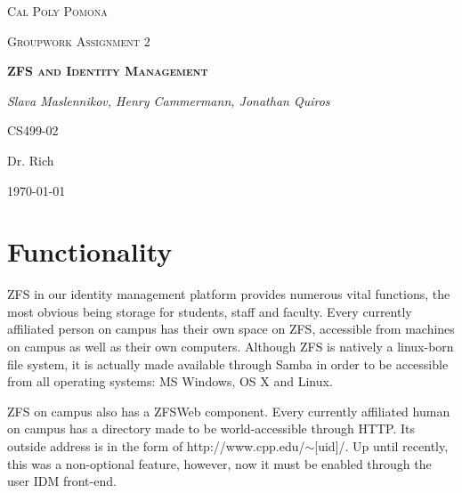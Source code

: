 \documentclass[letterpaper,12pt,titlepage]{article}
\date{Monday, March 7th 2016}
\author{Slava Maslennikov \and Henry Cammermann \and Jonathan Quiros}
\begin{document}

\begin{titlepage}
\centering
{\scshape\LARGE Cal Poly Pomona\par}
\vspace{1cm}
{\scshape\Large Groupwork Assignment 2\par}
\vspace{1.5cm}
{\scshape\bfseries ZFS and Identity Management\par}
\vspace{2cm}
{\Large\itshape Slava Maslennikov, Henry Cammermann, Jonathan Quiros\par}
\vfill
CS499-02\par
Dr. Rich
\vfill
{\large \today\par}
\end{titlepage}

\tableofcontents

%

\section{Functionality}
ZFS in our identity management platform provides numerous vital functions, the most obvious being storage for students, staff and faculty. Every currently affiliated person on campus has their own space on ZFS, accessible from machines on campus as well as their own computers. Although ZFS is natively a linux-born file system, it is actually made available through Samba in order to be accessible from all operating systems: MS Windows, OS X and Linux. 

ZFS on campus also has a ZFSWeb component. Every currently affiliated human on campus has a directory made to be world-accessible through HTTP. Its outside address is in the form of http://www.cpp.edu/$\sim$[uid]/. Up until recently, this was a non-optional feature, however, now it must be enabled through the user IDM front-end.

\end{document}
